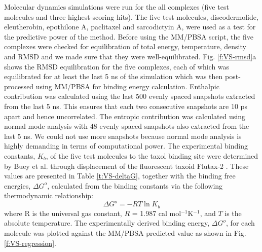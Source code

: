 \documentclass[11pt]{report}
\begin{document}
Molecular dynamics simulations were run for the all complexes
(five test molecules and three highest-scoring hits). The five test molecules, discodermolide, eleutherobin, epothilone A, paclitaxel and sarcodictyin A, were used as a test for the predictive power of
the method. Before using the MM/PBSA script, the five complexes were checked for equilibration of total energy, temperature, density and RMSD and we made sure that they were well-equilibrated. Fig.
\ref{f:VS-rmsd}a 
shows the RMSD equilibration for the five complexes, each of which was equilibrated for at least the last 5 ns of the simulation which was then post-processed using MM/PBSA for binding energy calculation. Enthalpic contribution was calculated using the last 500 evenly spaced snapshots extracted from the last 5 ns. This ensures that each two consecutive snapshots are 10 ps apart and hence uncorrelated. The entropic contribution was calculated using normal mode analysis with 48 evenly spaced snapshots also extracted from the last 5 ns. We could not use more snapshots because normal mode analysis is highly demanding in terms of
computational power. The experimental binding constants, $K_b$, of the five test molecules to the taxol binding site were determined by Buey et al. through displacement of the fluorescent taxoid Flutax-2
\cite{Buey2004,Buey2005}. These values are presented in 
Table \ref{t:VS-deltaG}, together with the binding free energies,
$\Delta{G}^{o}$, calculated from the binding constants via the following thermodynamic relationship:
\begin{equation}
\label{eq:VS-dG/K}
\Delta{G}^{o} = -RT \ln K_{b}
\end{equation}
where R is the universal gas constant, $R$ = 1.987 cal mol$^{-1}$K$^{−1}$, and $T$ is the absolute temperature. The experimentally derived binding energy, $\Delta{G}^{o}$, for each molecule was plotted against the MM/PBSA 
predicted value as shown in Fig.
\ref{f:VS-regression}. 
\end{document}
